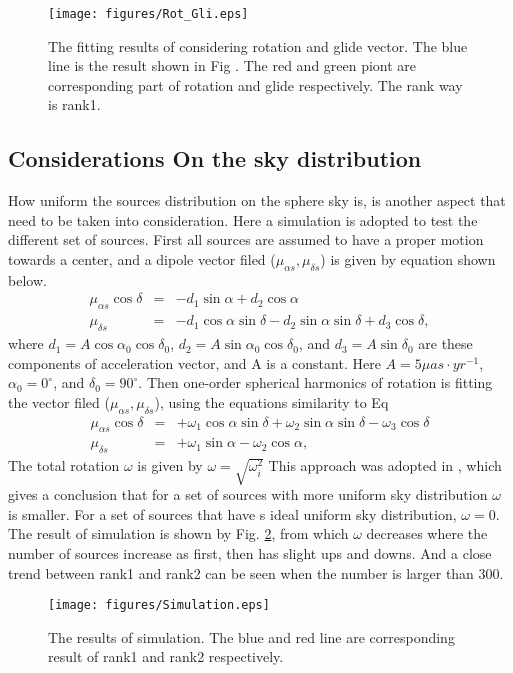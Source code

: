 \documentclass{aa}
\begin{document}
	\begin{figure}
   \centering
   \texttt{[image: figures/Rot\_Gli.eps]}
      \caption{
      The fitting results of considering rotation and glide vector. The blue line is the result shown in Fig . The red and green piont are  corresponding part of rotation and glide respectively. The rank way is rank1.
              }
         \label{Fig:Rot_gli}
   \end{figure}

\subsection{Considerations On the sky distribution}
How uniform the sources distribution on the sphere sky is, is another aspect that need to be taken into consideration. Here a simulation is adopted to test the different set of sources. First all sources are assumed to have a proper motion towards a center, and a dipole vector filed ($\mu_{\alpha s}, \mu_{\delta s}$) is given by equation shown below. 
\begin{eqnarray}
      \mu_{\alpha s}\cos\delta & = 
                             & -d_1\sin\alpha + d_2\cos\alpha                                                                 \\
      \mu_{\delta s}           & = 
                             & -d_1\cos\alpha\sin\delta -d_2\sin\alpha\sin\delta +d_3\cos\delta,
   \end{eqnarray}
where $d_1 = A\cos\alpha_0\cos\delta_0$, $d_2 = A\sin\alpha_0\cos\delta_0$, and $d_3 = A\sin\delta_0$ are these components of acceleration vector, and A is a constant. Here $A = 5 \mu as\cdot yr^{-1}$, $\alpha_0 = 0^{\circ}$, and $\delta_0 = 90^{\circ}$.  Then one-order spherical harmonics of rotation is fitting the vector filed ($\mu_{\alpha s}, \mu_{\delta s}$), using the equations similarity to Eq
\begin{eqnarray}
      \mu_{\alpha s}\cos\delta & = 
                                & +\omega_1\cos\alpha\sin\delta +\omega_2\sin\alpha\sin\delta -\omega_3\cos\delta \\
      \mu_{\delta s}           & = 
      						    & +\omega_1\sin\alpha - \omega_2\cos\alpha,
   \end{eqnarray}
The total rotation $\omega$ is given by $\omega = \sqrt{\omega_i^2 }$
This approach was adopted in
, which gives a conclusion that for a set of sources with more uniform sky distribution $\omega$ is smaller. For a set of sources that have s ideal uniform sky distribution, $\omega = 0$. The result of simulation is shown by Fig. \ref{Fig:sim}, from which $\omega$ decreases where the number of sources increase as first, then has slight ups and downs.
And a close trend between rank1 and rank2 can be seen when the number is larger than 300.
	\begin{figure}
   \centering
   \texttt{[image: figures/Simulation.eps]}
      \caption{
      The results of simulation. The blue and red line are corresponding result of rank1 and rank2 respectively.
              }
         \label{Fig:sim}
   \end{figure}
\end{document}
